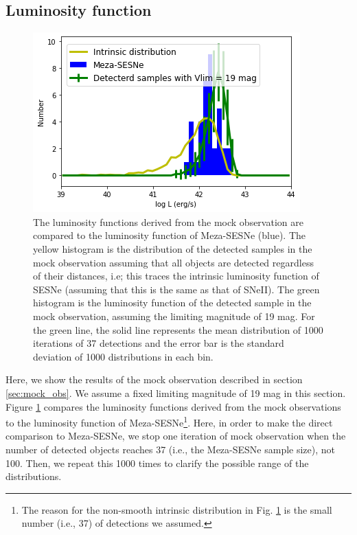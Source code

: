 \documentclass[twocolumn, linenumbers]{aastex62}
\begin{document}
\subsection{Luminosity function} \label{sec:lfun_mock}
\begin{figure}[htbp]
	\includegraphics[width=\columnwidth]{L_dist_compare_intrinsic_to_observed.png}
    \caption{The luminosity functions derived from the mock observation are compared to the luminosity function of Meza-SESNe (blue). The yellow histogram is the distribution of the detected samples in the mock observation assuming that all objects are detected regardless of their distances, i.e; this traces the intrinsic luminosity function of SESNe (assuming that this is the same as that of SNeII). The green histogram is the luminosity function of the detected sample in the mock observation, assuming the limiting magnitude of 19 mag. For the green line, the solid line represents the mean distribution of 1000 iterations of 37 detections and the error bar is the standard deviation of 1000 distributions in each bin.}  
     \label{L_dist_mock_compare_19_to_data}
\end{figure}

Here, we show the results of the mock observation described in section \ref{sec:mock_obs}. We assume a fixed limiting magnitude of 19 mag in this section. Figure \ref{L_dist_mock_compare_19_to_data} compares the luminosity functions derived from the mock observations to the luminosity function of Meza-SESNe\footnote{The reason for the non-smooth intrinsic distribution in Fig. \ref{L_dist_mock_compare_19_to_data} is the small number (i.e., 37) of detections we assumed.}. Here, in order to make the direct comparison to Meza-SESNe, we stop one iteration of mock observation when the number of detected objects reaches 37 (i.e., the Meza-SESNe sample size), not 100. Then, we repeat this 1000 times to clarify the possible range of the distributions.
\end{document}
